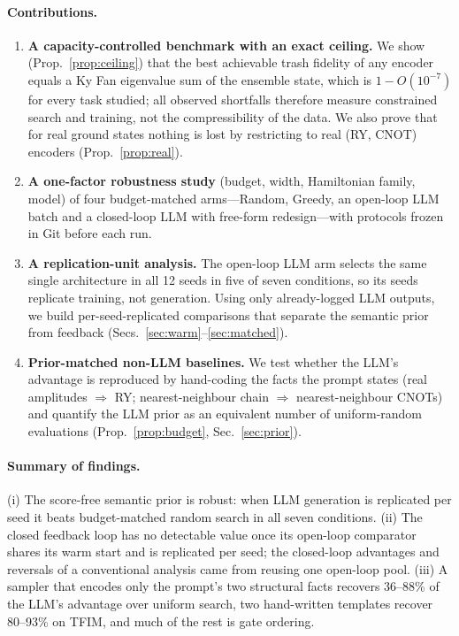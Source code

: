 \documentclass[11pt]{article}
\begin{document}
\paragraph{Contributions.}
\begin{enumerate}[leftmargin=*,itemsep=2pt]
\item \textbf{A capacity-controlled benchmark with an exact ceiling.}
We show (Prop.~\ref{prop:ceiling}) that the best achievable trash fidelity of any
encoder equals a Ky Fan eigenvalue sum of the ensemble state, which is
$1-O(10^{-7})$ for every task studied; all observed shortfalls therefore measure
constrained search and training, not the compressibility of the data.
We also prove that for real ground states nothing is lost by restricting to real
(RY, CNOT) encoders (Prop.~\ref{prop:real}).
\item \textbf{A one-factor robustness study} (budget, width, Hamiltonian family,
model) of four budget-matched arms---Random, Greedy, an open-loop LLM batch and a
closed-loop LLM with free-form redesign---with protocols frozen in Git before
each run.
\item \textbf{A replication-unit analysis.} The open-loop LLM arm selects the same
single architecture in all 12 seeds in five of seven conditions, so its seeds
replicate training, not generation. Using only already-logged LLM outputs, we build
per-seed-replicated comparisons that separate the semantic prior from feedback
(Secs.~\ref{sec:warm}--\ref{sec:matched}).
\item \textbf{Prior-matched non-LLM baselines.} We test whether the LLM's advantage
is reproduced by hand-coding the facts the prompt states (real amplitudes
$\Rightarrow$ RY; nearest-neighbour chain $\Rightarrow$ nearest-neighbour CNOTs) and
quantify the LLM prior as an equivalent number of uniform-random evaluations
(Prop.~\ref{prop:budget}, Sec.~\ref{sec:prior}).
\end{enumerate}

\paragraph{Summary of findings.}
(i) The score-free semantic prior is robust: when LLM generation is replicated per
seed it beats budget-matched random search in all seven conditions.
(ii) The closed feedback loop has no detectable value once its open-loop comparator
shares its warm start and is replicated per seed; the closed-loop advantages and
reversals of a conventional analysis came from reusing one open-loop pool.
(iii) A sampler that encodes only the prompt's two structural facts recovers
36--88\% of the LLM's advantage over uniform search, two hand-written templates recover
80--93\% on TFIM, and much of the rest is gate ordering.
\end{document}
